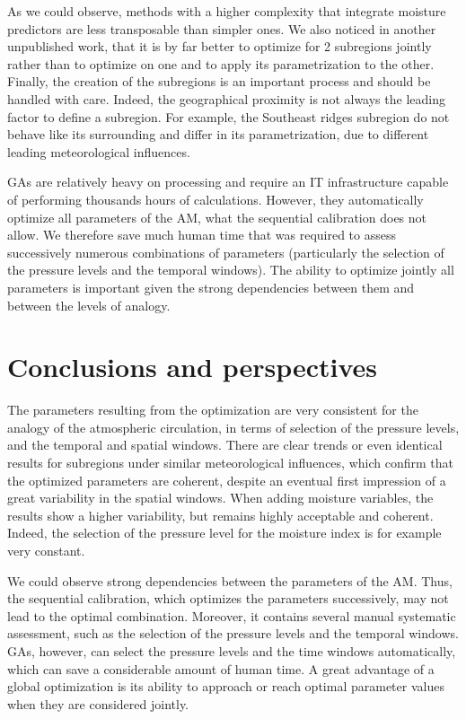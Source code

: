 \documentclass[5p]{elsarticle}
\begin{document}
As we could observe, methods with a higher complexity that integrate moisture predictors are less transposable than simpler ones. We also noticed in another unpublished work, that it is by far better to optimize for 2 subregions jointly rather than to optimize on one and to apply its parametrization to the other. Finally, the creation of the subregions is an important process and should be handled with care. Indeed, the geographical proximity is not always the leading factor to define a subregion. For example, the Southeast ridges subregion do not behave like its surrounding and differ in its parametrization, due to different leading meteorological influences.

GAs are relatively heavy on processing and require an IT infrastructure capable of performing thousands hours of calculations. However, they automatically optimize all parameters of the AM, what the sequential calibration does not allow. We therefore save much human time that was required to assess successively numerous combinations of parameters (particularly the selection of the pressure levels and the temporal windows). The ability to optimize jointly all parameters is important given the strong dependencies between them and between the levels of analogy.


\section{Conclusions and perspectives}
\label{sec:conclusions}






The parameters resulting from the optimization are very consistent for the analogy of the atmospheric circulation, in terms of selection of the pressure levels, and the temporal and spatial windows. There are clear trends or even identical results for subregions under similar meteorological influences, which confirm that the optimized parameters are coherent, despite an eventual first impression of a great variability in the spatial windows. When adding moisture variables, the results show a higher variability, but remains highly acceptable and coherent. Indeed, the selection of the pressure level for the moisture index is for example very constant.

We could observe strong dependencies between the parameters of the AM. Thus, the sequential calibration, which optimizes the parameters successively, may not lead to the optimal combination. Moreover, it contains several manual systematic assessment, such as the selection of the pressure levels and the temporal windows. GAs, however, can select the pressure levels and the time windows automatically, which can save a considerable amount of human time. A great advantage of a global optimization is its ability to approach or reach optimal parameter values when they are considered jointly. 
\end{document}
